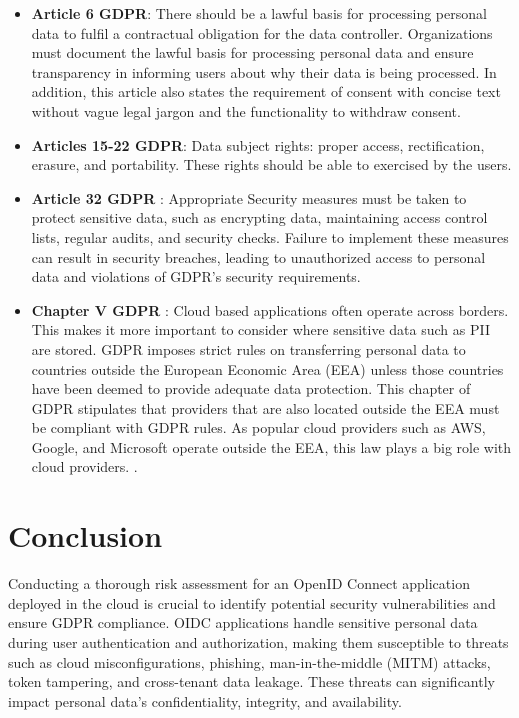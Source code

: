 \begin{itemize}
    \item \textbf{Article 6 GDPR}: There should be a lawful basis for processing personal data to fulfil a contractual obligation for the data controller. Organizations must document the lawful basis for processing personal data and ensure transparency in informing users about why their data is being processed. In addition, this article also states the requirement of consent with concise text without vague legal jargon and the functionality to withdraw consent.
    
    \item \textbf{Articles 15-22 GDPR}: Data subject rights: proper access, rectification, erasure, and portability. These rights should be able to exercised by the users. 

    \item \textbf{Article 32 GDPR }: Appropriate Security measures must be taken to protect sensitive data, such as encrypting data, maintaining access control lists, regular audits, and security checks. Failure to implement these measures can result in security breaches, leading to unauthorized access to personal data and violations of GDPR’s security requirements.
    
    
    \item \textbf{Chapter V GDPR }: Cloud based applications often operate across borders. This makes it more important to consider where sensitive data such as PII are stored. GDPR imposes strict rules on transferring personal data to countries outside the European Economic Area (EEA) unless those countries have been deemed to provide adequate data protection. This chapter of GDPR stipulates that providers that are also located outside the EEA must be compliant with GDPR rules. As popular cloud providers such as AWS, Google, and Microsoft operate outside the EEA, this law plays a big role with cloud providers.  
.
\end{itemize}

\section{Conclusion}

Conducting a thorough risk assessment for an OpenID Connect application deployed in the cloud is crucial to identify potential security vulnerabilities and ensure GDPR compliance. OIDC applications handle sensitive personal data during user authentication and authorization, making them susceptible to threats such as cloud misconfigurations, phishing, man-in-the-middle (MITM) attacks, token tampering, and cross-tenant data leakage. These threats can significantly impact personal data's confidentiality, integrity, and availability. 

